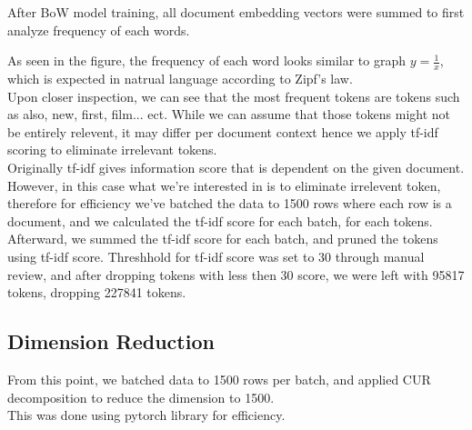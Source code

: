 \documentclass[12pt]{article}
\begin{document}
After BoW model training, all document embedding vectors were summed to first analyze frequency of each words.

As seen in the figure, the frequency of each word looks similar to graph $y=\frac{1}{x}$, which is expected in natrual language according to Zipf's law.\\
Upon closer inspection, we can see that the most frequent tokens are tokens such as also, new, first, film... ect. While we can assume that those tokens might not be entirely relevent, it may differ per document context hence we apply tf-idf scoring to eliminate irrelevant tokens.\\

Originally tf-idf gives information score that is dependent on the given document. However, in this case what we're interested in is to eliminate irrelevent token, therefore for efficiency we've batched the data to 1500 rows where each row is a document, and we calculated the tf-idf score for each batch, for each tokens. Afterward, we summed the tf-idf score for each batch, and pruned the tokens using tf-idf score. Threshhold for tf-idf score was set to 30 through manual review, and after dropping tokens with less then 30 score, we were left with 95817 tokens, dropping 227841 tokens.\\

\subsection{Dimension Reduction}
From this point, we batched data to 1500 rows per batch, and applied CUR decomposition to reduce the dimension to 1500.\\
This was done using pytorch library for efficiency.
\end{document}
